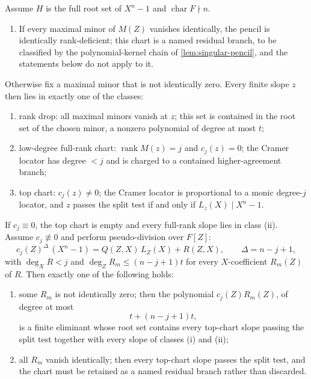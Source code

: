 \begin{theorem}\label{thm:v13-spi}
Assume $H$ is the full root set of $X^n-1$ and $\operatorname{char}F\nmid n$.
\begin{enumerate}[label=\textup{(\arabic*)},start=0]
\item If every maximal minor of $M(Z)$ vanishes identically, the pencil is identically rank-deficient; this chart is a named residual branch, to be classified by the polynomial-kernel chain of \cref{lem:singular-pencil}, and the statements below do not apply to it.
\end{enumerate}
Otherwise fix a maximal minor that is not identically zero.  Every finite slope $z$ then lies in exactly one of the classes:
\begin{enumerate}[label=\textup{(\roman*)}]
\item rank drop: all maximal minors vanish at $z$; this set is contained in the root set of the chosen minor, a nonzero polynomial of degree at most $t$;
\item low-degree full-rank chart: $\operatorname{rank}M(z)=j$ and $c_j(z)=0$; the Cramer locator has degree $<j$ and is charged to a contained higher-agreement branch;
\item top chart: $c_j(z)\ne0$; the Cramer locator is proportional to a monic degree-$j$ locator, and $z$ passes the split test if and only if $L_z(X)\mid X^n-1$.
\end{enumerate}
If $c_j\equiv0$, the top chart is empty and every full-rank slope lies in class \textup{(ii)}.  Assume $c_j\not\equiv0$ and perform pseudo-division over $F[Z]$:
\[
        c_j(Z)^\Delta\,(X^n-1)=Q(Z,X)\,L_Z(X)+R(Z,X),
        \qquad
        \Delta=n-j+1,
\]
with $\deg_XR<j$ and $\deg_ZR_m\le(n-j+1)t$ for every $X$-coefficient $R_m(Z)$ of $R$.  Then exactly one of the following holds:
\begin{enumerate}[label=\textup{(\alph*)}]
\item some $R_m$ is not identically zero; then the polynomial $c_j(Z)R_m(Z)$, of degree at most
\[
        t+(n-j+1)t,
\]
is a finite eliminant whose root set contains every top-chart slope passing the split test together with every slope of classes \textup{(i)} and \textup{(ii)};
\item all $R_m$ vanish identically; then every top-chart slope passes the split test, and the chart must be retained as a named residual branch rather than discarded.
\end{enumerate}
\end{theorem}


